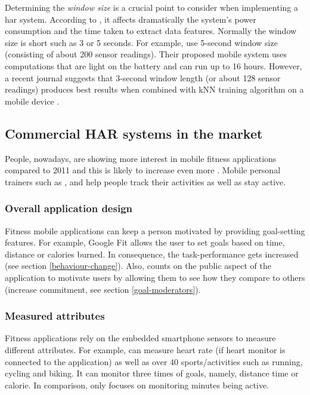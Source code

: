         Determining the \textit{window size} is a crucial point to consider when implementing a \gls{har} system. According to \citet[2]{torreshuitzil2015}, it affects dramatically the system’s power consumption and the time taken to extract data features. Normally the window size is short such as 3 or 5 seconds. For example, \citet[3]{torreshuitzil2015} use 5-second window size (consisting of about 200 sensor readings). Their proposed mobile system uses computations that are light on the battery and can run up to 16 hours. However, a recent journal suggests that 3-second window length (or about 128 sensor readings) produces best results when combined with kNN training algorithm on a mobile device \citep[126-136]{bashir2016}. 
        
    \subsection{Commercial HAR systems in the market}
    People, nowadays, are showing more interest in mobile fitness applications compared to 2011 and this is likely to increase even more \citep{googletrends}. Mobile personal trainers such as \citet[]{endomondo2017}, \citet[]{fitnesskeeper2017} and \citet[]{human2017}  help people track their activities as well as stay active.
    
        \subsubsection{Overall application design}
        Fitness mobile applications can keep a person motivated by providing goal-setting features. For example, Google Fit \citep{googleinc2017} allows the user to set goals based on time, distance or calories burned. In consequence, the task-performance gets increased (see section \ref{behaviour-change}). Also, \citet[]{human2017} counts on the public aspect of the application to motivate users by allowing them to see how they compare to others (increase commitment, see section \ref{goal-moderators}).
        
        \subsubsection{Measured attributes}
        Fitness applications rely on the embedded smartphone sensors to measure different attributes. For example, \citet[]{endomondo2017} can measure heart rate (if heart monitor is connected to the application) as well as over 40 sports/activities such as running, cycling and biking. It can monitor three times of goals, namely, distance time or calorie. In comparison, \citet[]{human2017} only focuses on monitoring minutes being active.
        
